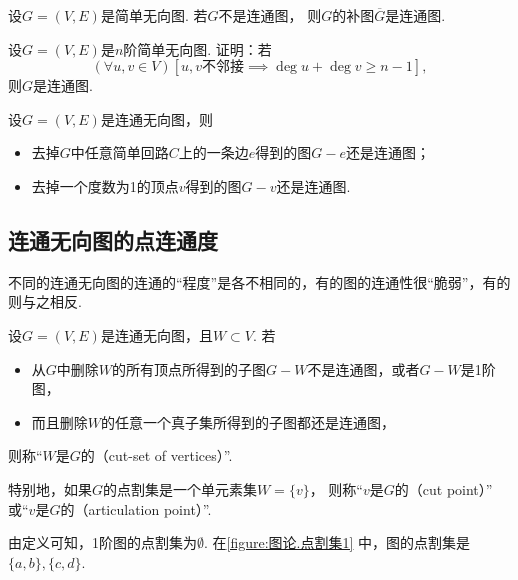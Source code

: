 \begin{example}
设\(G = (V,E)\)是简单无向图.
若\(G\)不是连通图，
则\(G\)的补图\(\overline{G}\)是连通图.
\end{example}

\begin{example}
设\(G = (V,E)\)是\(n\)阶简单无向图.
证明：若\begin{equation*}
	(\forall u,v \in V)
	\left[
		\text{$u,v$不邻接}
		\implies
		\deg u + \deg v \geq n - 1
	\right],
\end{equation*}
则\(G\)是连通图.
\end{example}

\begin{theorem}
设\(G = (V,E)\)是连通无向图，则\begin{itemize}
	\item 去掉\(G\)中任意简单回路\(C\)上的一条边\(e\)得到的图\(G - e\)还是连通图；
	\item 去掉一个度数为1的顶点\(v\)得到的图\(G - v\)还是连通图.
\end{itemize}
\end{theorem}

\subsection{连通无向图的点连通度}
不同的连通无向图的连通的“程度”是各不相同的，有的图的连通性很“脆弱”，有的则与之相反.

\begin{definition}
设\(G = (V,E)\)是连通无向图，且\(W \subset V\).
若\begin{itemize}
	\item 从\(G\)中删除\(W\)的所有顶点所得到的子图\(G-W\)不是连通图，或者\(G-W\)是1阶图，
	\item 而且删除\(W\)的任意一个真子集所得到的子图都还是连通图，
\end{itemize}
则称“\(W\)是\(G\)的（cut-set of vertices）”.

特别地，如果\(G\)的点割集是一个单元素集\(W = \{v\}\)，
则称“\(v\)是\(G\)的（cut point）”
或“\(v\)是\(G\)的（articulation point）”.
\end{definition}

由定义可知，1阶图的点割集为\(\emptyset\).
在\cref{figure:图论.点割集1} 中，图的点割集是\(\{a,b\},\{c,d\}\).

